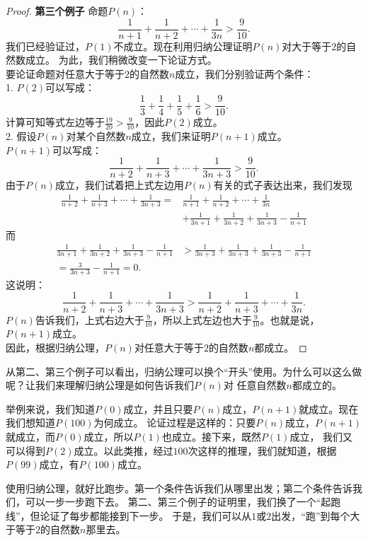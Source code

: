 \documentclass[12pt,UTF8,fontset=none]{ctexbook}
\begin{document}
\begin{proof}{\textbf{第三个例子 }}
    命题$P(n)$：
    $$ \frac{1}{n+1} + \frac{1}{n+2} + \cdots + \frac{1}{3n} > \frac{9}{10}. $$
    我们已经验证过，$P(1)$不成立。现在利用归纳公理证明$P(n)$对大于等于$2$的自然数成立。
    为此，我们稍微改变一下论证方式。\\
    要论证命题对任意大于等于$2$的自然数$n$成立，我们分别验证两个条件：\\
    1. $P(2)$可以写成：
    $$\frac13 + \frac14 + \frac15 + \frac16 > \frac{9}{10}.$$
    计算可知等式左边等于$\frac{19}{20} > \frac{9}{10}$，因此$P(2)$成立。\\
    2. 假设$P(n)$对某个自然数$n$成立，我们来证明$P(n+1)$成立。\\
    $P(n+1)$可以写成：
    $$ \frac{1}{n+2} + \frac{1}{n+3} + \cdots + \frac{1}{3n+3} > \frac{9}{10}. $$
    由于$P(n)$成立，我们试着把上式左边用$P(n)$有关的式子表达出来，我们发现
    \begin{align*}
        \frac{1}{n+2} + \frac{1}{n+3} + \cdots + \frac{1}{3n+3} =& \frac{1}{n+1} + \frac{1}{n+2} + \cdots + \frac{1}{3n}  \\
        &+ \frac{1}{3n+1} + \frac{1}{3n+2} + \frac{1}{3n+3} - \frac{1}{n+1}  
    \end{align*}
    而
    \begin{align*}
        \frac{1}{3n+1} + \frac{1}{3n+2} + \frac{1}{3n+3} - \frac{1}{n+1} &>  \frac{1}{3n+3} + \frac{1}{3n+3} + \frac{1}{3n+3} - \frac{1}{n+1}  \\
        = \frac{3}{3n+3} - \frac{1}{n+1} = 0.  
    \end{align*}
    这说明：
    $$ \frac{1}{n+2} + \frac{1}{n+3} + \cdots + \frac{1}{3n+3} > \frac{1}{n+2} + \frac{1}{n+3} + \cdots + \frac{1}{3n}. $$
    $P(n)$告诉我们，上式右边大于$\frac{9}{10}$，所以上式左边也大于$\frac{9}{10}$。也就是说，$P(n+1)$成立。\\
    因此，根据归纳公理，$P(n)$对任意大于等于$2$的自然数$n$都成立。    
\end{proof}
从第二、第三个例子可以看出，归纳公理可以换个“开头”使用。为什么可以这么做呢？让我们来理解归纳公理是如何告诉我们$P(n)$对
任意自然数$n$都成立的。

举例来说，我们知道$P(0)$成立，并且只要$P(n)$成立，$P(n+1)$就成立。现在我们想知道$P(100)$为何成立。
论证过程是这样的：只要$P(n)$成立，$P(n+1)$就成立，而$P(0)$成立，所以$P(1)$也成立。接下来，既然$P(1)$成立，
我们又可以得到$P(2)$成立。以此类推，经过$100$次这样的推理，我们就知道，根据$P(99)$成立，有$P(100)$成立。

使用归纳公理，就好比跑步。第一个条件告诉我们从哪里出发；第二个条件告诉我们，可以一步一步跑下去。
第二、第三个例子的证明里，我们换了一个“起跑线”，但论证了每步都能接到下一步。
于是，我们可以从$1$或$2$出发，“跑”到每个大于等于$2$的自然数$n$那里去。
\end{document}
